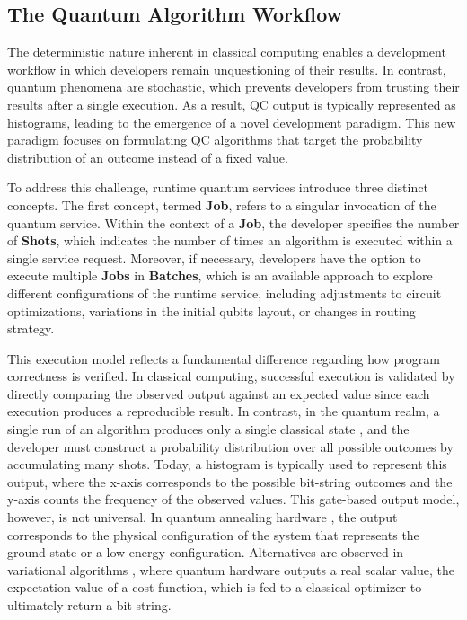 \documentclass{article}
\begin{document}
\subsection{The Quantum Algorithm Workflow}
\label{subsec:qc-workflow}

The deterministic nature inherent in classical computing enables a development workflow in which developers remain unquestioning of their results. In contrast, quantum phenomena are stochastic, which prevents developers from trusting their results after a single execution. As a result, QC output is typically represented as histograms, leading to the emergence of a novel development paradigm. This new paradigm focuses on formulating QC algorithms that target the probability distribution of an outcome instead of a fixed value.

To address this challenge, runtime quantum services introduce three distinct concepts. The first concept, termed \textbf{Job}, refers to a singular invocation of the quantum service. Within the context of a \textbf{Job}, the developer specifies the number of \textbf{Shots}, which indicates the number of times an algorithm is executed within a single service request. Moreover, if necessary, developers have the option to execute multiple \textbf{Jobs} in \textbf{Batches}, which is an available approach to explore different configurations of the runtime service, including adjustments to circuit optimizations, variations in the initial qubits layout, or changes in routing strategy.

This execution model reflects a fundamental difference regarding how program correctness is verified. In classical computing, successful execution is validated by directly comparing the observed output against an expected value since each execution produces a reproducible result. In contrast, in the quantum realm, a single run of an algorithm produces only a single classical state \cite{nielsenQuantumComputationQuantuma_2010}, and the developer must construct a probability distribution over all possible outcomes by accumulating many shots. Today, a histogram is typically used to represent this output, where the x-axis corresponds to the possible bit-string outcomes and the y-axis counts the frequency of the observed values. This gate-based output model, however, is not universal. In quantum annealing hardware \cite{Hauke_2020_2020}, the output corresponds to the physical configuration of the system that represents the ground state or a low-energy configuration. Alternatives are observed in variational algorithms \cite{McClean_2016_2016}, where quantum hardware outputs a real scalar value, the expectation value of a cost function, which is fed to a classical optimizer to ultimately return a bit-string.
\end{document}
